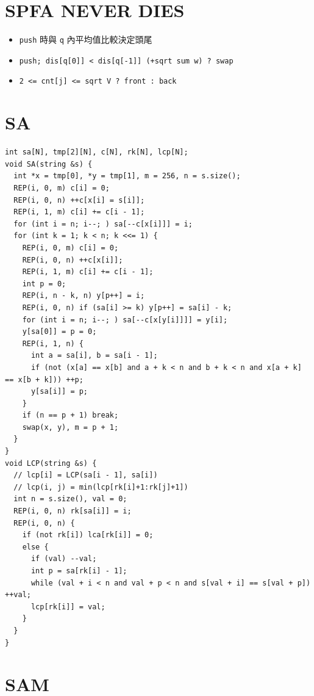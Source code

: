 \documentclass[10pt, a4paper, twocolumn]{article}
\begin{document}
\section{SPFA NEVER DIES}

\begin{itemize}[tight_item]
    \item \texttt{push} 時與 \texttt{q} 內平均值比較決定頭尾
    \item \texttt{push; dis[q[0]] < dis[q[-1]] (+sqrt sum w) ? swap}
    \item \texttt{2 <= cnt[j] <= sqrt V ? front : back}
\end{itemize}

\section{SA}

\begin{verbatim}
int sa[N], tmp[2][N], c[N], rk[N], lcp[N];
void SA(string &s) {
  int *x = tmp[0], *y = tmp[1], m = 256, n = s.size();
  REP(i, 0, m) c[i] = 0;
  REP(i, 0, n) ++c[x[i] = s[i]];
  REP(i, 1, m) c[i] += c[i - 1];
  for (int i = n; i--; ) sa[--c[x[i]]] = i;
  for (int k = 1; k < n; k <<= 1) {
    REP(i, 0, m) c[i] = 0;
    REP(i, 0, n) ++c[x[i]];
    REP(i, 1, m) c[i] += c[i - 1];
    int p = 0;
    REP(i, n - k, n) y[p++] = i;
    REP(i, 0, n) if (sa[i] >= k) y[p++] = sa[i] - k;
    for (int i = n; i--; ) sa[--c[x[y[i]]]] = y[i];
    y[sa[0]] = p = 0;
    REP(i, 1, n) {
      int a = sa[i], b = sa[i - 1];
      if (not (x[a] == x[b] and a + k < n and b + k < n and x[a + k] == x[b + k])) ++p;
      y[sa[i]] = p;
    }
    if (n == p + 1) break;
    swap(x, y), m = p + 1;
  }
}
void LCP(string &s) {
  // lcp[i] = LCP(sa[i - 1], sa[i])
  // lcp(i, j) = min(lcp[rk[i]+1:rk[j]+1])
  int n = s.size(), val = 0;
  REP(i, 0, n) rk[sa[i]] = i;
  REP(i, 0, n) {
    if (not rk[i]) lca[rk[i]] = 0;
    else {
      if (val) --val;
      int p = sa[rk[i] - 1];
      while (val + i < n and val + p < n and s[val + i] == s[val + p]) ++val;
      lcp[rk[i]] = val;
    }
  }
}
\end{verbatim}

\section{SAM}
\end{document}
